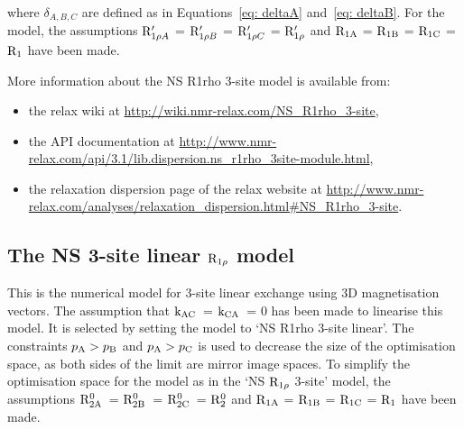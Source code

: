 where $\delta_{A,B,C}$ are defined as in Equations~\ref{eq: deltaA} and~\ref{eq: deltaB}.
For the model, the assumptions $\mathrm{R}_{1\rho A}'$ = $\mathrm{R}_{1\rho B}'$ = $\mathrm{R}_{1\rho C}'$ = $\mathrm{R}_{1\rho}'$ and $\mathrm{R}_\textrm{1A}$ = $\mathrm{R}_\textrm{1B}$ = $\mathrm{R}_\textrm{1C}$ = $\mathrm{R}_1$ have been made.

More information about the NS R1rho 3-site model is available from:
\begin{itemize}
  \item the relax wiki at \url{http://wiki.nmr-relax.com/NS\_R1rho\_3-site},
  \item the API documentation at \url{http://www.nmr-relax.com/api/3.1/lib.dispersion.ns\_r1rho\_3site-module.html},
  \item the relaxation dispersion page of the relax website at \url{http://www.nmr-relax.com/analyses/relaxation\_dispersion.html#NS\_R1rho\_3-site}.
\end{itemize}



\subsection{The NS 3-site linear $\mathrm{R}_{1\rho}$ model}
\label{sect: dispersion: NS R1rho 3-site linear model}

This is the numerical model for 3-site linear exchange using 3D magnetisation vectors.
The assumption that $\textrm{k}_\textrm{AC}$~= $\textrm{k}_\textrm{CA}$~= 0 has been made to linearise this model.
It is selected by setting the model to `NS R1rho 3-site linear'.
The constraints $p_\textrm{A} > p_\textrm{B}$ and $p_\textrm{A} > p_\textrm{C}$ is used to decrease the size of the optimisation space, as both sides of the limit are mirror image spaces.
To simplify the optimisation space for the model as in the `NS $\mathrm{R}_{1\rho}$ 3-site' model, the assumptions $\mathrm{R}_\mathrm{2A}^0$~= $\mathrm{R}_\mathrm{2B}^0$~= $\mathrm{R}_\mathrm{2C}^0$~= $\mathrm{R}_2^0$ and $\mathrm{R}_\textrm{1A}$ = $\mathrm{R}_\textrm{1B}$ = $\mathrm{R}_\textrm{1C}$ = $\mathrm{R}_1$ have been made.

